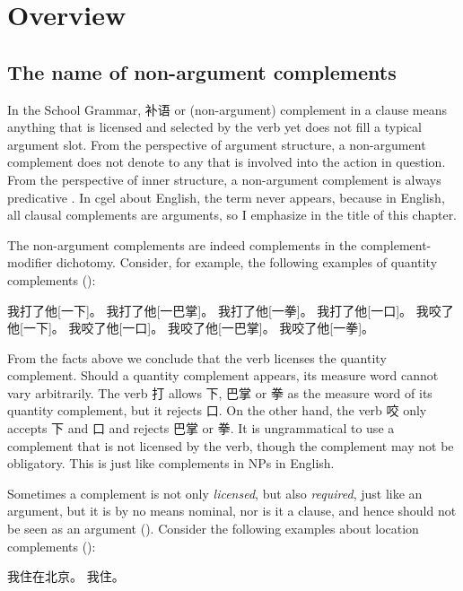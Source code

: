 \documentclass[../main.tex]{subfiles}
\begin{document}

\section{Overview}

\subsection{The name of non-argument complements}\label{sec:complement-name}

In the School Grammar, 补语 or (non-argument) complement in a clause means anything 
that is licensed and selected by the verb 
yet does not fill a typical argument slot. 
From the perspective of argument structure, a non-argument complement does not denote to 
any  that is involved into the action in question.
From the perspective of inner structure, a non-argument complement is always predicative 
\citep[]{zhudexigrammar}. %
In \ac{cgel} about English, the term  never appears,
because in English, all clausal complements are arguments, 
so I emphasize  in the title of this chapter. 

The non-argument complements are indeed complements in the complement-modifier dichotomy. 
Consider, for example, the following examples 
of quantity complements ():
\begin{exe}
    \ex \begin{xlist}
        \ex 我打了他[一下]。
        \ex 我打了他[一巴掌]。
        \ex 我打了他[一拳]。
        \ex *我打了他[一口]。
        \ex 我咬了他[一下]。
        \ex 我咬了他[一口]。
        \ex *我咬了他[一巴掌]。
        \ex *我咬了他[一拳]。
    \end{xlist}
\end{exe}
From the facts above we conclude that the verb licenses the quantity complement. 
Should a quantity complement appears, its measure word cannot vary arbitrarily. 
The verb 打 allows 下, 巴掌 or 拳 as the measure word of its quantity complement, but it rejects 口. 
On the other hand, the verb 咬 only accepts 下 and 口 and rejects 巴掌 or 拳.
It is ungrammatical to use a complement that is not licensed by the verb, 
though the complement may not be obligatory. 
This is just like complements in NPs in English.

Sometimes a complement is not only \emph{licensed}, but also \emph{required}, just like an argument,
but it is by no means nominal, nor is it a clause, 
and hence should not be seen as an argument (). 
Consider the following examples about location complements ():
\begin{exe}
    \ex \begin{xlist}
        \ex 我住在北京。
        \ex *我住。
    \end{xlist}
\end{exe}
\end{document}
